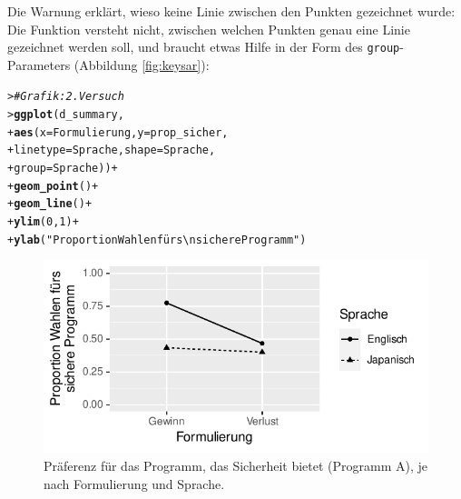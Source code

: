 \documentclass[oneside, 10pt]{book}\usepackage[]{graphicx}\usepackage[]{xcolor}
\makeatletter
\newcommand{\hlnum}[1]{\textcolor[rgb]{0.686,0.059,0.569}{#1}}%
\newcommand{\hlstr}[1]{\textcolor[rgb]{0.192,0.494,0.8}{#1}}%
\newcommand{\hlcom}[1]{\textcolor[rgb]{0.678,0.584,0.686}{\textit{#1}}}%
\newcommand{\hlopt}[1]{\textcolor[rgb]{0,0,0}{#1}}%
\newcommand{\hlstd}[1]{\textcolor[rgb]{0.345,0.345,0.345}{#1}}%
\newcommand{\hlkwc}[1]{\textcolor[rgb]{0.333,0.667,0.333}{#1}}%
\newcommand{\hlkwd}[1]{\textcolor[rgb]{0.737,0.353,0.396}{\textbf{#1}}}%
\newenvironment{kframe}{%
 \def\at@end@of@kframe{}%
 \ifinner\ifhmode%
  \def\at@end@of@kframe{\end{minipage}}%
  \begin{minipage}{\columnwidth}%
 \fi\fi%
 \def\FrameCommand##1{\hskip\@totalleftmargin \hskip-\fboxsep
 \colorbox{shadecolor}{##1}\hskip-\fboxsep
     \hskip-\linewidth \hskip-\@totalleftmargin \hskip\columnwidth}%
 \MakeFramed {\advance\hsize-\width
   \@totalleftmargin\z@ \linewidth\hsize
   \@setminipage}}%
 {\par\unskip\endMakeFramed%
 \at@end@of@kframe}
\newenvironment{knitrout}{}{} %
\makeatother
\begin{document}
Die Warnung erklärt, wieso keine Linie zwischen den
Punkten gezeichnet wurde: Die Funktion versteht nicht,
zwischen welchen Punkten genau eine Linie gezeichnet werden soll,
und braucht etwas Hilfe in der Form des \texttt{group}-Parameters 
(Abbildung \ref{fig:keysar}):
\begin{knitrout}
\color{fgcolor}\begin{kframe}
\begin{alltt}
\hlstd{> }\hlcom{# Grafik: 2. Versuch}
\hlstd{> }\hlkwd{ggplot}\hlstd{(d_summary,}
\hlstd{+ }       \hlkwd{aes}\hlstd{(}\hlkwc{x} \hlstd{= Formulierung,} \hlkwc{y} \hlstd{= prop_sicher,}
\hlstd{+ }           \hlkwc{linetype} \hlstd{= Sprache,} \hlkwc{shape} \hlstd{= Sprache,}
\hlstd{+ }           \hlkwc{group} \hlstd{= Sprache))} \hlopt{+}
\hlstd{+ }  \hlkwd{geom_point}\hlstd{()} \hlopt{+}
\hlstd{+ }  \hlkwd{geom_line}\hlstd{()} \hlopt{+}
\hlstd{+ }  \hlkwd{ylim}\hlstd{(}\hlnum{0}\hlstd{,} \hlnum{1}\hlstd{)} \hlopt{+}
\hlstd{+ }  \hlkwd{ylab}\hlstd{(}\hlstr{"Proportion Wahlen fürs\textbackslash{}nsichere Programm"}\hlstd{)}
\end{alltt}
\end{kframe}\begin{figure}[tp]

{\centering \includegraphics[width=.6\textwidth]{figs/unnamed-chunk-444-1} 

}

\caption{Präferenz für das Programm, das Sicherheit bietet (Programm A), je nach Formulierung und Sprache.\label{fig:keysar}}\label{fig:unnamed-chunk-444}
\end{figure}

\end{knitrout}
\end{document}
